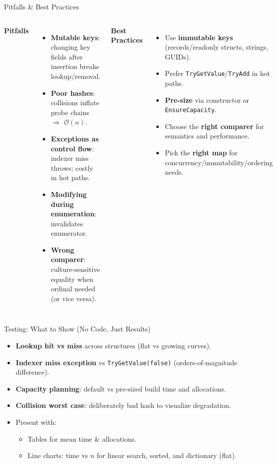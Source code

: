 \documentclass[aspectratio=169]{beamer}
\newcommand{\bigO}[1]{$\mathcal{O}(#1)$}
\newcommand{\code}[1]{\texttt{#1}}
\begin{document}
\begin{frame}{Pitfalls \& Best Practices}
  \begin{columns}[T,onlytextwidth]
    \textbf{Pitfalls}
    \begin{itemize}
      \item \textbf{Mutable keys}: changing key fields after insertion breaks lookup/removal.
      \item \textbf{Poor hashes}: collisions inflate probe chains $\Rightarrow$ \bigO{n}.
      \item \textbf{Exceptions as control flow}: indexer miss throws; costly in hot paths.
      \item \textbf{Modifying during enumeration}: invalidates enumerator.
      \item \textbf{Wrong comparer}: culture-sensitive equality when ordinal needed (or vice versa).
    \end{itemize}
    \textbf{Best Practices}
    \begin{itemize}
      \item Use \textbf{immutable keys} (records/readonly structs, strings, GUIDs).
      \item Prefer \code{TryGetValue}/\code{TryAdd} in hot paths.
      \item \textbf{Pre-size} via constructor or \code{EnsureCapacity}.
      \item Choose the \textbf{right comparer} for semantics and performance.
      \item Pick the \textbf{right map} for concurrency/immutability/ordering needs.
    \end{itemize}
  \end{columns}
\end{frame}

\begin{frame}{Testing: What to Show (No Code, Just Results)}
  \begin{itemize}
    \item \textbf{Lookup hit vs miss} across structures (flat vs growing curves).
    \item \textbf{Indexer miss exception} vs \code{TryGetValue(false)} (orders-of-magnitude difference).
    \item \textbf{Capacity planning}: default vs pre-sized build time and allocations.
    \item \textbf{Collision worst case}: deliberately bad hash to visualize degradation.
    \item Present with:
      \begin{itemize}
        \item Tables for mean time \& allocations.
        \item Line charts: time vs $n$ for linear search, sorted, and dictionary (flat).
      \end{itemize}
  \end{itemize}
\end{frame}
\end{document}
